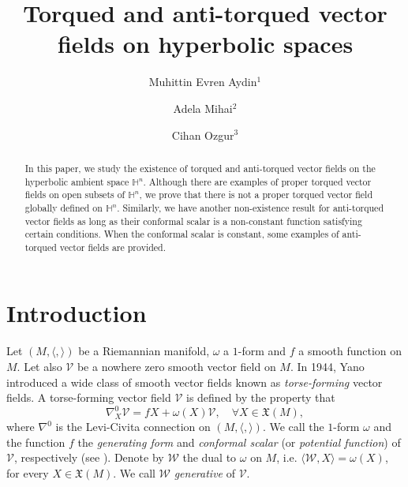 \documentclass[12pt]{amsart}
\def\h{\mathbb H}
\theoremstyle{definition}
\begin{document}
\title{Torqued and anti-torqued vector fields on hyperbolic spaces}


\author{Muhittin Evren Aydin$^1$}
\address{$^1$Department of Mathematics, Faculty of Science, Firat University, 23200, Elazig,   T\"urkiye}
\author{ Adela Mihai$^2$}
 \address{$^2$Technical University of Civil Engineering Bucharest,
Department of Mathematics and Computer Science, 020396, Bucharest, Romania
and Transilvania University of Bra\c{s}ov, Interdisciplinary Doctoral
School, 500036, Bra\c{s}ov, Romania}
\author{ Cihan Ozgur$^3$}
 \address{$^3$Department of Mathematics, Faculty of Arts and Sciences, Izmir Democracy University, 35140,  Izmir, T\"urkiye}



\begin{abstract}
In this paper, we study the existence of torqued and anti-torqued vector fields on the hyperbolic ambient space $\h^n$. Although there are examples of proper torqued vector fields on open subsets of $\h^n$, we prove that there is not a proper torqued vector field globally defined on $\h^n$. Similarly, we have another non-existence result for anti-torqued vector fields  as long as their conformal scalar is a non-constant function satisfying certain conditions. When the conformal scalar is constant, some examples of anti-torqued vector fields are provided.
\end{abstract}
\maketitle

\section{Introduction} \label{intro}

Let $(M,\langle, \rangle)$ be a Riemannian manifold, $\omega$ a $1$-form and $f$ a smooth function on $M$. Let also $\mathcal{V}$ be a nowhere zero smooth vector field on $M$. In 1944, Yano \cite{ya0} introduced a wide class of smooth vector fields known as {\it torse-forming} vector fields. A torse-forming vector field $\mathcal{V}$ is defined by the property that
\begin{equation}\label{tors}
\nabla^0_X \mathcal{V}=f X +  \omega(X) \mathcal{V}, \quad \forall X\in \mathfrak{X}(M),
\end{equation}
where $\nabla^0$ is the Levi-Civita connection on $(M,\langle, \rangle)$. We call the $1$-form $\omega$ and the function $f$ the {\it generating form} and {\it conformal scalar} (or {\it potential function}) of $\mathcal{V}$, respectively (see \cite{bo,mih0}). Denote by $\mathcal{W}$ the dual to $\omega$ on $M$, i.e. $\langle \mathcal{W}, X \rangle =\omega (X)$, for every $X \in \mathfrak{X}(M)$. We call $\mathcal{W}$ {\it generative} of $\mathcal{V}$.
\end{document}
